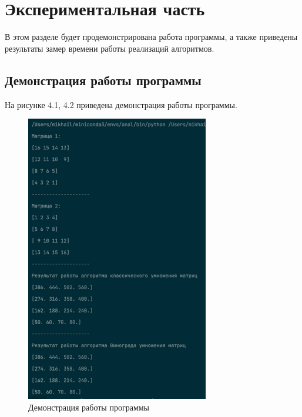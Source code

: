 \chapter{Экспериментальная часть}
В этом разделе будет продемонстрирована работа программы, а также
приведены результаты замер времени работы реализаций алгоритмов.

\section{Демонстрация работы программы}
На рисунке 4.1, 4.2 приведена демонстрация работы программы.

\FloatBarrier
\begin{figure}[h!]
	\begin{center}
		\includegraphics[width=80mm]{inc/demonstrate.png}
	\end{center}

	\caption{Демонстрация работы программы}
\end{figure}


